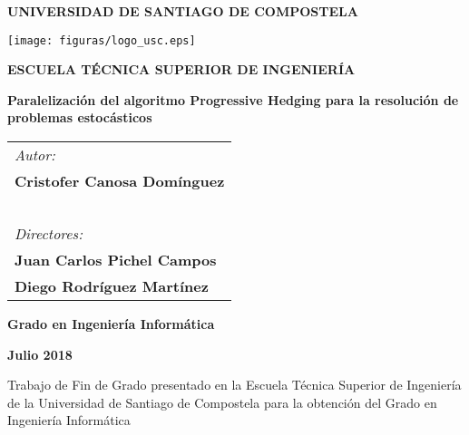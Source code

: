 \pagestyle{empty}
\begin{center}
{\bf\Large UNIVERSIDAD DE SANTIAGO DE COMPOSTELA}

\vspace{0.5cm}
\texttt{[image: figuras/logo\_usc.eps]}

\vspace{0.5cm}
{\bf\large ESCUELA TÉCNICA SUPERIOR DE INGENIERÍA}

\vspace{2cm}
{\bf\LARGE Paralelización del algoritmo Progressive Hedging para la resolución de problemas estocásticos}
\end{center} 

\vspace{2cm}
\hspace{4cm}\begin{tabular}{l}
{\it\Large Autor:} \\
{\bf\Large Cristofer Canosa Domínguez} \\
~ \\
{\it\Large Directores:} \\
{\bf\Large Juan Carlos Pichel Campos} \\
{\bf\Large Diego Rodríguez Martínez} \\
\end{tabular}

\vspace{2cm}
\begin{center}
{\bf\Large Grado en Ingeniería Informática}

\vspace{0.5cm}
{\bf\large Julio 2018}

\vspace{0.5cm}
Trabajo de Fin de Grado presentado en la Escuela Técnica Superior de Ingeniería de la Universidad de Santiago de Compostela para la obtención del Grado en Ingeniería Informática
\end{center}

